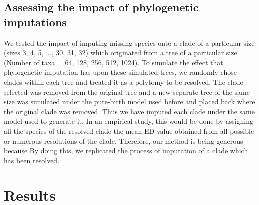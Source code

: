 \documentclass[12pt,english]{article}
\begin{document}
\subsection*{Assessing the impact of phylogenetic imputations}
We tested the impact of imputing missing species onto a clade of a particular
size (sizes 3, 4, 5, ..., 30, 31, 32) which originated from a tree of a
particular size (Number of taxa = 64, 128, 256, 512, 1024).
To simulate the effect that phylogenetic imputation has upon these
simulated trees, we randomly chose clades within each tree and treated
it as a polytomy to be resolved.
The clade selected was removed from the original tree and a new separate tree of
the same size was simulated under the pure-birth model used before and placed
back where the original clade was removed. Thus we have imputed each clade under
the same model used to generate it. In an empirical study, this would be done by
assigning all the species of the resolved clade the mean ED value obtained from
all possible or numerous resolutions of the clade. Therefore, our method is
being generous because By doing this, we replicated the process of imputation of
a clade which has been resolved.


\section*{Results}

\end{document}
